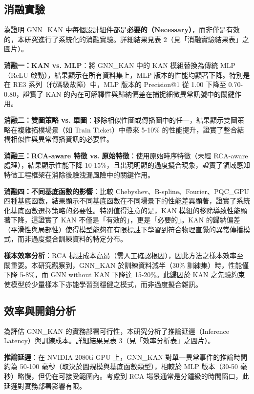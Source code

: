 \documentclass[10pt,a4paper,twocolumn]{article}
\begin{document}
\subsection{消融實驗}

為證明 GNN\_KAN 中每個設計組件都是\textbf{必要的（Necessary）}，而非僅是有效的，本研究進行了系統化的消融實驗。詳細結果見表 2（見「消融實驗結果表」之圖片）。

\textbf{消融一：KAN vs. MLP}：將 GNN\_KAN 中的 KAN 模組替換為傳統 MLP（ReLU 啟動），結果顯示在所有資料集上，MLP 版本的性能均顯著下降。特別是在 RE3 系列（代碼級故障）中，MLP 版本的 Precision@1 從 1.00 下降至 0.70-0.80，證實了 KAN 的內在可解釋性與歸納偏差在捕捉細微異常訊號中的關鍵作用。

\textbf{消融二：雙圖策略 vs. 單圖}：移除相似性圖或傳播圖中的任一，結果顯示雙圖策略在複雜拓樸場景（如 Train Ticket）中帶來 5-10\% 的性能提升，證實了整合結構相似性與異常傳播資訊的必要性。

\textbf{消融三：RCA-aware 特徵 vs. 原始特徵}：使用原始時序特徵（未經 RCA-aware 處理），結果顯示性能下降 10-15\%，且出現明顯的過度擬合現象，證實了領域感知特徵工程框架在消除後驗洩漏風險中的關鍵作用。

\textbf{消融四：不同基底函數的影響}：比較 Chebyshev、B-spline、Fourier、PQC\_GPU 四種基底函數，結果顯示不同基底函數在不同場景下的性能差異顯著，證實了系統化基底函數選擇策略的必要性。特別值得注意的是，KAN 模組的移除導致性能顯著下降，這證實了 KAN 不僅是「有效的」，更是「必要的」。KAN 的歸納偏差（平滑性與局部性）使得模型能夠在有限標註下學習到符合物理直覺的異常傳播模式，而非過度擬合訓練資料的特定分布。

\textbf{樣本效率分析}：RCA 標註成本高昂（需人工確認根因），因此方法之樣本效率至關重要。本研究觀察到，GNN\_KAN 於訓練資料減半（30\% 訓練集）時，性能僅下降 5-8\%，而 GNN without KAN 下降達 15-20\%。此歸因於 KAN 之先驗約束使模型於少量樣本下亦能學習到穩健之模式，而非過度擬合雜訊。

\subsection{效率與開銷分析}

為評估 GNN\_KAN 的實務部署可行性，本研究分析了推論延遲（Inference Latency）與訓練成本。詳細結果見表 3（見「效率分析表」之圖片）。

\textbf{推論延遲}：在 NVIDIA 2080ti GPU 上，GNN\_KAN 對單一異常事件的推論時間約為 50-100 毫秒（取決於圖規模與基底函數類型），相較於 MLP 版本（30-50 毫秒）略慢，但仍在可接受範圍內。考慮到 RCA 場景通常是分鐘級的時間窗口，此延遲對實務部署影響有限。
\end{document}
